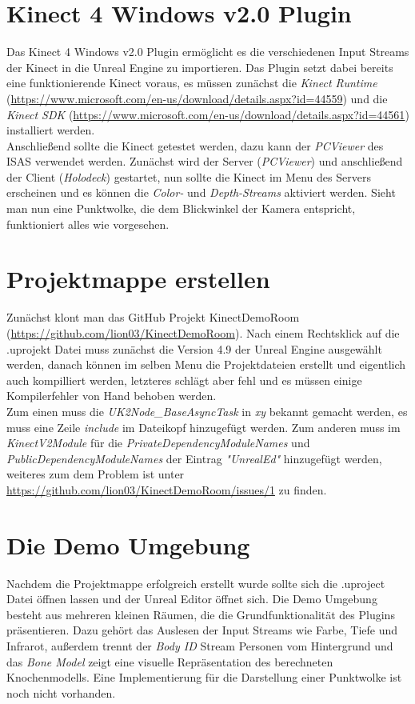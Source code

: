 \documentclass[cover]{isas-seminar}
\begin{document}
\section{Kinect 4 Windows v2.0 Plugin}
Das Kinect 4 Windows v2.0 Plugin ermöglicht es die verschiedenen Input Streams der Kinect in die Unreal Engine zu importieren. Das Plugin setzt dabei bereits eine funktionierende Kinect voraus, es müssen zunächst die \textit{Kinect Runtime} (\url{https://www.microsoft.com/en-us/download/details.aspx?id=44559}) und die \textit{Kinect SDK} (\url{https://www.microsoft.com/en-us/download/details.aspx?id=44561}) installiert werden. \\
Anschließend sollte die Kinect getestet werden, dazu kann der \textit{PCViewer} des ISAS verwendet werden. Zunächst wird der Server (\textit{PCViewer}) und anschließend der Client (\textit{Holodeck}) gestartet, nun sollte die Kinect im Menu des Servers erscheinen und es können die \textit{Color-} und \textit{Depth-Streams} aktiviert werden. Sieht man nun eine Punktwolke, die dem Blickwinkel der Kamera entspricht, funktioniert alles wie vorgesehen.\\

\section{Projektmappe erstellen}
Zunächst klont man das GitHub Projekt KinectDemoRoom (\url{https://github.com/lion03/KinectDemoRoom}). Nach einem Rechtsklick auf die .uprojekt Datei muss zunächst die Version 4.9 der Unreal Engine ausgewählt werden, danach können im selben Menu die Projektdateien erstellt und eigentlich auch kompilliert werden, letzteres schlägt aber fehl und es müssen einige Kompilerfehler von Hand behoben werden. \\
Zum einen muss die \textit{UK2Node_BaseAsyncTask} in \textit{xy} bekannt gemacht werden, es muss eine Zeile \textit{include} im Dateikopf hinzugefügt werden. 
Zum anderen muss im \textit{KinectV2Module} für die \textit{PrivateDependencyModuleNames} und \textit{PublicDependencyModuleNames} der Eintrag \textit{"UnrealEd"} hinzugefügt werden, weiteres zum dem Problem ist unter \url{https://github.com/lion03/KinectDemoRoom/issues/1} zu finden.\\

\section{Die Demo Umgebung}
Nachdem die Projektmappe erfolgreich erstellt wurde sollte sich die .uproject Datei öffnen lassen und der Unreal Editor öffnet sich. Die Demo Umgebung besteht aus mehreren kleinen Räumen, die die Grundfunktionalität des Plugins präsentieren. Dazu gehört das Auslesen der Input Streams wie Farbe, Tiefe und Infrarot, außerdem trennt der \textit{Body ID} Stream Personen vom Hintergrund und das \textit{Bone Model} zeigt eine visuelle Repräsentation des berechneten Knochenmodells. Eine Implementierung für die Darstellung einer Punktwolke ist noch nicht vorhanden. \\
\end{document}
